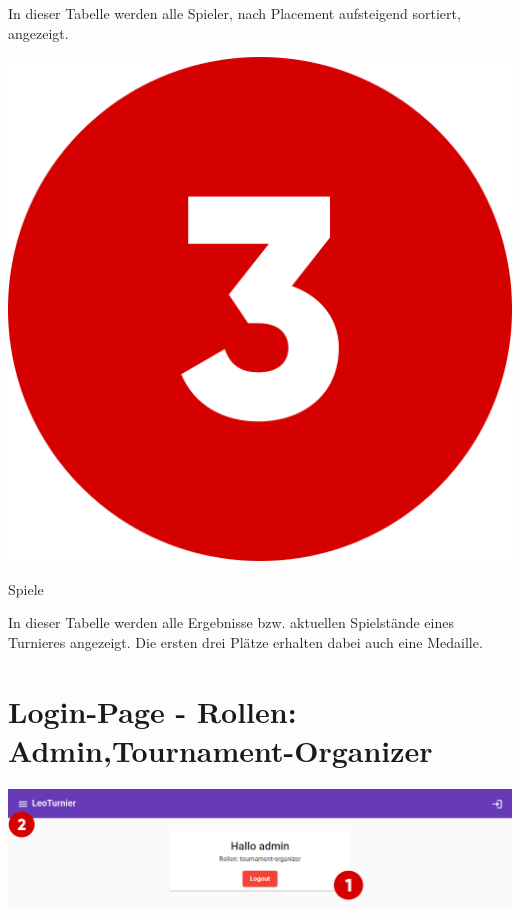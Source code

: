 In dieser Tabelle werden alle Spieler, nach Placement aufsteigend sortiert, angezeigt.

\bigskip
\includegraphics[scale=0.05]{pics/user-guide/numbers/number-3.png} \begin{LARGE} Spiele \end{LARGE}

In dieser Tabelle werden alle Ergebnisse bzw. aktuellen Spielstände eines Turnieres angezeigt.
Die ersten drei Plätze erhalten dabei auch eine Medaille.

\newpage
\section{Login-Page - Rollen: Admin,Tournament-Organizer}
\includegraphics[scale=0.4]{pics/user-guide/login-page.PNG}
\bigskip

